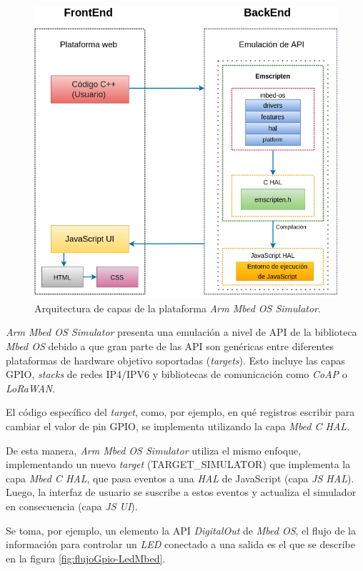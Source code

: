 \begin{figure}[ht]
	\centering
	\includegraphics[scale=.55]{./Figures/ArquitecturaMBED.png}
	\caption{Arquitectura de capas de la plataforma \textit{Arm Mbed OS Simulator}.}
	\label{fig:Arquitectura}
\end{figure}

\textit{Arm Mbed OS Simulator} presenta una emulación a nivel de API de la biblioteca \textit{Mbed OS} debido a que gran parte de las API son genéricas entre diferentes plataformas de hardware objetivo soportadas (\textit{targets}). Esto incluye las capas GPIO, \textit{stacks} de redes IP4/IPV6 y bibliotecas de comunicación como \textit{CoAP} o \textit{LoRaWAN}. 

El código específico del \textit{target}, como, por ejemplo, en qué registros escribir para cambiar el valor de pin GPIO, se implementa utilizando la capa \textit{Mbed C HAL}. 

De esta manera, \textit{Arm Mbed OS Simulator} utiliza el mismo enfoque, implementando un nuevo \textit{target} (TARGET\_SIMULATOR) que implementa la capa \textit{Mbed C HAL}, que pasa eventos a una \textit{HAL} de JavaScript (capa \textit{JS HAL}). Luego, la interfaz de usuario se suscribe a estos eventos y actualiza el simulador en consecuencia (capa \textit{JS UI}).

Se toma, por ejemplo, un elemento la API \textit{DigitalOut} de \textit{Mbed OS}, el flujo de la información para controlar un \textit{LED} conectado a una salida es el que se describe en la figura \ref{fig:flujoGpio-LedMbed}.

